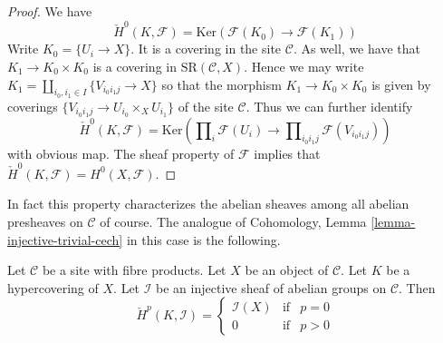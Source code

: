 \begin{proof}
We have
$$
\check{H}^0(K, \mathcal{F})
=
\text{Ker}(\mathcal{F}(K_0) \longrightarrow \mathcal{F}(K_1))
$$
Write $K_0 = \{U_i \to X\}$. It is a covering in the site
$\mathcal{C}$. As well, we have that $K_1 \to K_0 \times K_0$
is a covering in $\text{SR}(\mathcal{C}, X)$. Hence we may
write $K_1 = \amalg_{i_0, i_1 \in I} \{V_{i_0i_1j} \to X\}$
so that the morphism $K_1 \to K_0 \times K_0$ is given
by coverings $\{V_{i_0i_1j} \to U_{i_0} \times_X U_{i_1}\}$
of the site $\mathcal{C}$. Thus we can further identify
$$
\check{H}^0(K, \mathcal{F})
=
\text{Ker}(
\prod\nolimits_i \mathcal{F}(U_i)
\longrightarrow
\prod\nolimits_{i_0i_1 j} \mathcal{F}(V_{i_0i_1j})
)
$$
with obvious map. The sheaf property of $\mathcal{F}$
implies that $\check{H}^0(K, \mathcal{F}) = H^0(X, \mathcal{F})$.
\end{proof}

\noindent
In fact this property characterizes the abelian sheaves among all
abelian presheaves on $\mathcal{C}$ of course.
The analogue of Cohomology, Lemma \ref{lemma-injective-trivial-cech}
in this case is the following.

\begin{lemma}
\label{lemma-injective-trivial-cech}
Let $\mathcal{C}$ be a site with fibre products.
Let $X$ be an object of $\mathcal{C}$.
Let $K$ be a hypercovering of $X$.
Let $\mathcal{I}$ be an injective sheaf of abelian groups on $\mathcal{C}$.
Then
$$
\check{H}^p(K, \mathcal{I}) =
\left\{
\begin{matrix}
\mathcal{I}(X) & \text{if} & p = 0 \\
0 & \text{if} & p > 0
\end{matrix}
\right.
$$
\end{lemma}

